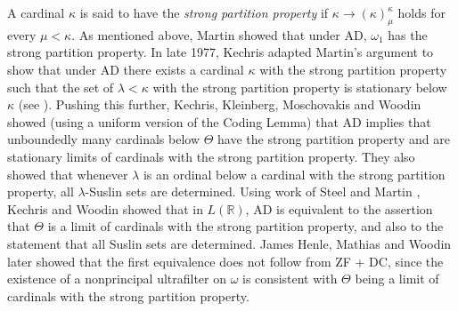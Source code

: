 \documentclass{book}%
\begin{document}
A cardinal $\kappa$ is said to have the \emph{strong partition
property} if $\kappa \to
(\kappa)^{\kappa}_{\mu}$ holds for every $\mu < \kappa$. As mentioned
above, Martin showed that under AD, $\omega_{1}$ has the strong
partition property. In late 1977, Kechris adapted
Martin's argument
to show that under AD there exists a cardinal $\kappa$ with the
strong partition property such that the set of $\lambda < \kappa$
with the strong partition property is stationary below $\kappa$ (see \cite[p.~432]{Kanamori}).
Pushing this further, Kechris, Kleinberg, Moschovakis and Woodin
 showed (using a uniform version of the
Coding Lemma) that AD implies that unboundedly many cardinals below
$\Theta$ have the strong partition property and are stationary limits of cardinals with the strong
partition property. They also showed that whenever $\lambda$ is an ordinal below
a cardinal with the strong partition property, all
$\lambda$-Suslin sets are determined. Using work of Steel
 and Martin , Kechris and Woodin
 showed that in $L(\mathbb{R})$, AD is
equivalent to the assertion that $\Theta$ is a limit of cardinals
with the strong partition property, and also to the statement that all Suslin sets are determined.
James Henle, Mathias
and Woodin  later showed that the first
equivalence does not follow from ZF + DC, since the existence of a nonprincipal
ultrafilter on $\omega$ is consistent with $\Theta$ being a limit of
cardinals with the strong partition property.
\end{document}
